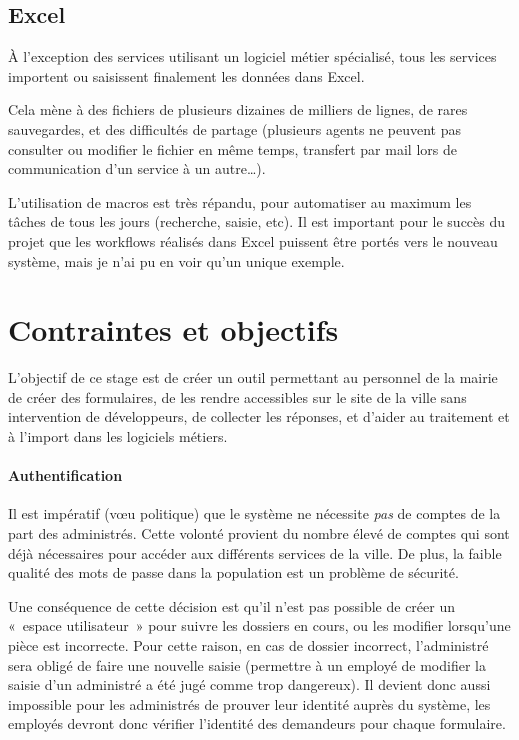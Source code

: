 \documentclass[11pt,french]{memoir}
\begin{document}
	\subsection{Excel}\label{subsec:excel}

	À l'exception des services utilisant un logiciel métier spécialisé, tous les services importent ou saisissent finalement les données dans Excel.

	Cela mène à des fichiers de plusieurs dizaines de milliers de lignes, de rares sauvegardes, et des difficultés de partage (plusieurs agents ne peuvent pas consulter ou modifier le fichier en même temps, transfert par mail lors de communication d'un service à un autre…).

	L'utilisation de macros est très répandu, pour automatiser au maximum les tâches de tous les jours (recherche, saisie, etc).
	Il est important pour le succès du projet que les workflows réalisés dans Excel puissent être portés vers le nouveau système, mais je n'ai pu en voir qu'un unique exemple.


	\section{Contraintes et objectifs}\label{sec:contraintes-et-objectifs}

	L'objectif de ce stage est de créer un outil permettant au personnel de la mairie de créer des formulaires, de les rendre accessibles sur le site de la ville sans intervention de développeurs, de collecter les réponses, et d'aider au traitement et à l'import dans les logiciels métiers.

	\paragraph{Authentification}
	Il est impératif (vœu politique) que le système ne nécessite \emph{pas} de comptes de la part des administrés.
	Cette volonté provient du nombre élevé de comptes qui sont déjà nécessaires pour accéder aux différents services de la ville.
	De plus, la faible qualité des mots de passe dans la population est un problème de sécurité.

	Une conséquence de cette décision est qu'il n'est pas possible de créer un «~espace utilisateur~» pour suivre les dossiers en cours, ou les modifier lorsqu'une pièce est incorrecte.
	Pour cette raison, en cas de dossier incorrect, l'administré sera obligé de faire une nouvelle saisie (permettre à un employé de modifier la saisie d'un administré a été jugé comme trop dangereux).
	Il devient donc aussi impossible pour les administrés de prouver leur identité auprès du système, les employés devront donc vérifier l'identité des demandeurs pour chaque formulaire.
\end{document}
